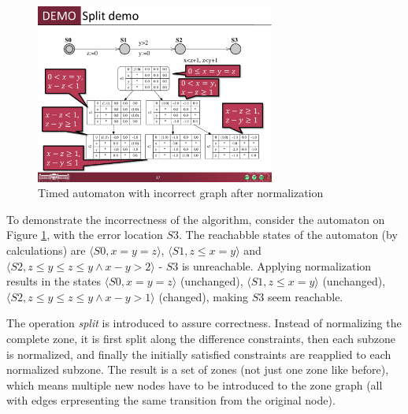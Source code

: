 \begin{figure} [h]
	\centering
	\includegraphics [width=0.7\textwidth] {include/figures/norm_incorrect_aut}%
	\caption{Timed automaton with incorrect graph after normalization}
	\label{fig:splitaut}
\end{figure}

\begin{example}
	To demonstrate the incorrectness of the algorithm, consider the automaton on Figure \ref{fig:splitaut}, with the error location $S3$. The reachabble states of the automaton (by calculations) are $\langle S0,x=y=z \rangle$, $\langle S1,z \leq x=y \rangle$ and $\langle S2,z \leq y \leq z \leq y \wedge x-y > 2\rangle$ - $S3$ is unreachable. Applying normalization results in the states $\langle S0,x=y=z \rangle$ (unchanged), $\langle S1,z \leq x=y \rangle$ (unchanged), $\langle S2,z \leq y \leq z \leq y \wedge x-y > 1\rangle$ (changed), making $S3$ seem reachable.
\end{example}

The operation \emph{split} \cite{bengtsson2004timed} is introduced to assure correctness. Instead of
normalizing the complete zone, it is first split along the difference constraints,
then each subzone is normalized, and finally the initially satisfied constraints are reapplied to each normalized subzone. The result is a set of zones (not just one zone like before), which means multiple new nodes have to be introduced to the zone graph (all with edges erpresenting the same transition from the original node).

